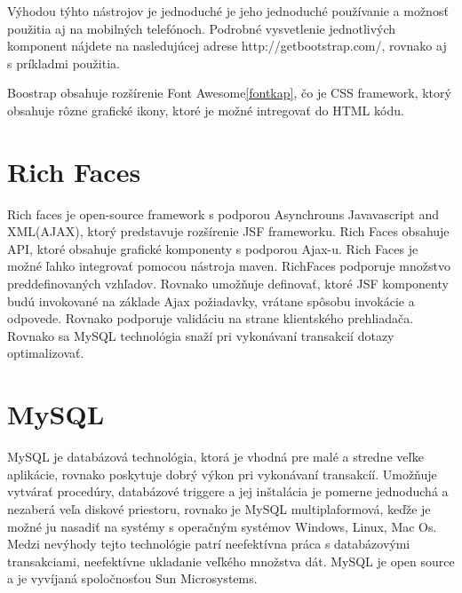 Výhodou týhto nástrojov je jednoduché je jeho jednoduché používanie a možnosť použitia aj na mobilných telefónoch. Podrobné vysvetlenie jednotlivých komponent nájdete na nasledujúcej adrese http://getbootstrap.com/, rovnako aj s príkladmi použitia. 

Boostrap obsahuje rozšírenie Font Awesome\ref{fontkap}, čo je CSS framework, ktorý obsahuje rôzne grafické ikony, ktoré je možné intregovať do HTML kódu.


\section{Rich Faces}\label{richkap}
Rich faces je open-source framework s podporou Asynchrouns Javavascript and XML(AJAX)\cite{ajaxbook}, ktorý predstavuje rozšírenie JSF frameworku\cite{jsfkap}. Rich Faces obsahuje API, ktoré obsahuje grafické komponenty s podporou Ajax-u. Rich Faces je možné ľahko integrovať pomocou nástroja  maven\cite{mavenkap}. RichFaces podporuje množstvo preddefinovaných vzhľadov. Rovnako umožňuje definovať, ktoré JSF komponenty budú invokované na základe Ajax požiadavky, vrátane spôsobu invokácie a odpovede. Rovnako podporuje validáciu na strane klientského prehliadača. Rovnako sa MySQL technológia snaží pri vykonávaní transakcií dotazy optimalizovať.


\section{MySQL}\label{mysqlkap}
MySQL je databázová technológia, ktorá je vhodná pre malé a stredne veľke aplikácie, rovnako poskytuje dobrý výkon pri vykonávaní transakcíí. Umožňuje vytvárať procedúry, databázové triggere a jej inštalácia je pomerne jednoduchá a nezaberá veľa diskové priestoru, rovnako je MySQL multiplaformová, keďže je možné ju nasadiť na systémy s operačným systémov Windows, Linux, Mac Os. Medzi nevýhody tejto technológie patrí neefektívna práca s databázovými transakciami, neefektívne ukladanie veľkého množstva dát. MySQL je open source a je vyvíjaná spoločnosťou Sun Microsystems.

